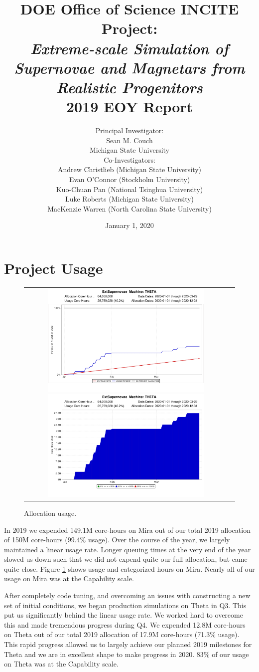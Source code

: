 \documentclass[12pt,titlepage]{article}
\title{DOE Office of Science INCITE Project:\\
{\it Extreme-scale Simulation of Supernovae and Magnetars from Realistic Progenitors}\\
2019 EOY Report}
\author{Principal Investigator:\\Sean M. Couch\\
  Michigan State University \vspace{0.1in}\\
  Co-Investigators: \\
  Andrew Christlieb (Michigan State University) \\
  Evan O'Connor (Stockholm University)\\
  Kuo-Chuan Pan (National Tsinghua University) \\
  Luke Roberts (Michigan State University) \\
  MacKenzie Warren (North Carolina State University) \\
}
\date{January 1, 2020}
\begin{document}
\maketitle


\section{Project Usage}



\begin{figure}
  \begin{tabular}{cc}
    \includegraphics[width=3.25in]{on_track_graph}
    \includegraphics[width=3.25in]{categorized_hours_graph} 
  \end{tabular}
  \caption{Allocation usage.}
  \label{fig:usage}
\end{figure}

In 2019 we expended 149.1M core-hours on Mira out of our total 2019 allocation of 150M core-hours (99.4\% usage). 
Over the course of the year, we largely maintained a linear usage rate.
Longer queuing times at the very end of the year slowed us down such that we did not expend quite our full allocation, but came quite close.
Figure \ref{fig:usage} shows usage and categorized hours on Mira.
Nearly all of our usage on Mira was at the Capability scale.

After completely code tuning, and overcoming an issues with constructing a new set of initial conditions, we began production simulations on Theta in Q3. 
This put us significantly behind the linear usage rate.
We worked hard to overcome this and made tremendous progress during Q4.
We expended 12.8M core-hours on Theta out of our total 2019 allocation of 17.9M core-hours (71.3\% usage). 
This rapid progress allowed us to largely achieve our planned 2019 milestones for Theta and we are in excellent shape to make progress in 2020.
83\% of our usage on Theta was at the Capability scale.
\end{document}
